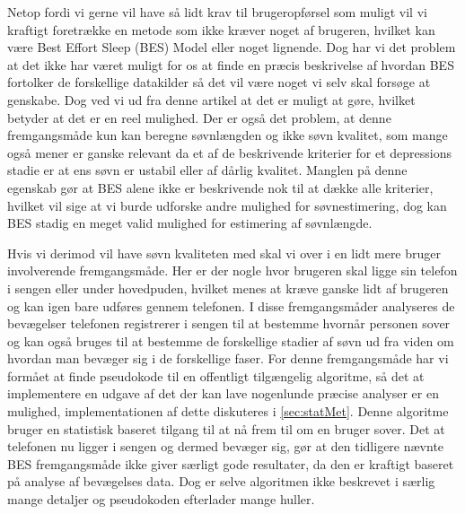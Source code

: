 Netop fordi vi gerne vil have så lidt krav til brugeropførsel som muligt vil vi kraftigt foretrække en metode som ikke kræver noget af brugeren, hvilket kan være Best Effort Sleep (BES) Model eller noget lignende. 
Dog har vi det problem at det ikke har været muligt for os at finde en præcis beskrivelse af hvordan BES fortolker de forskellige datakilder så det vil være noget vi selv skal forsøge at genskabe.
Dog ved vi ud fra denne artikel at det er muligt at gøre, hvilket betyder at det er en reel mulighed.
Der er også det problem, at denne fremgangsmåde kun kan beregne søvnlængden og ikke søvn kvalitet, som mange også mener er ganske relevant da et af de beskrivende kriterier for et depressions stadie er at ens søvn er ustabil eller af dårlig kvalitet.
Manglen på denne egenskab gør at BES alene ikke er beskrivende nok til at dække alle kriterier, hvilket vil sige at vi burde udforske andre mulighed for søvnestimering, dog kan BES stadig en meget valid mulighed for estimering af søvnlængde.

Hvis vi derimod vil have søvn kvaliteten med skal vi over i en lidt mere bruger involverende fremgangsmåde.
Her er der nogle hvor brugeren skal ligge sin telefon i sengen eller under hovedpuden, hvilket menes at kræve ganske lidt af brugeren og kan igen bare udføres gennem telefonen.
I disse fremgangsmåder analyseres de bevægelser telefonen registrerer i sengen til at bestemme hvornår personen sover og kan også bruges til at bestemme de forskellige stadier af søvn ud fra viden om hvordan man bevæger sig i de forskellige faser.
For denne fremgangsmåde har vi formået at finde pseudokode til en offentligt tilgængelig algoritme, så det at implementere en udgave af det der kan lave nogenlunde præcise analyser er en mulighed, implementationen af dette diskuteres i \cref{sec:statMet}.
Denne algoritme bruger en statistisk baseret tilgang til at nå frem til om en bruger sover.
Det at telefonen nu ligger i sengen og dermed bevæger sig, gør at den tidligere nævnte BES fremgangsmåde ikke giver særligt gode resultater, da den er kraftigt baseret på analyse af bevægelses data.
Dog er selve algoritmen ikke beskrevet i særlig mange detaljer og pseudokoden efterlader mange huller.

